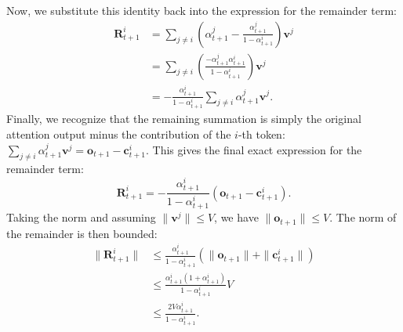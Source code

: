 Now, we substitute this identity back into the expression for the remainder term:
\begin{equation}
\begin{split}
    \mathbf{R}_{t+1}^i &= \sum_{j \neq i} \left( \alpha_{t+1}^j - \frac{\alpha_{t+1}^j}{1 - \alpha_{t+1}^i} \right) \mathbf{v}^j \\
    &= \sum_{j \neq i} \left( \frac{-\alpha_{t+1}^j \alpha_{t+1}^i}{1 - \alpha_{t+1}^i} \right) \mathbf{v}^j \\
    &= -\frac{\alpha_{t+1}^i}{1 - \alpha_{t+1}^i} \sum_{j \neq i} \alpha_{t+1}^j \mathbf{v}^j.
\end{split}
\end{equation}
Finally, we recognize that the remaining summation is simply the original attention output minus the contribution of the \(i\)-th token: \( \sum_{j \neq i} \alpha_{t+1}^j \mathbf{v}^j = \mathbf{o}_{t+1} - \mathbf{c}_{t+1}^i \). This gives the final exact expression for the remainder term:
\begin{equation}
    \mathbf{R}_{t+1}^i = -\frac{\alpha_{t+1}^i}{1-\alpha_{t+1}^i} \left( \mathbf{o}_{t+1} - \mathbf{c}_{t+1}^i \right).
\end{equation}
Taking the norm and assuming \( \|\mathbf{v}^j\| \le V \), we have \( \|\mathbf{o}_{t+1}\| \le V \). The norm of the remainder is then bounded:
\begin{equation}
\begin{split}
    \|\mathbf{R}_{t+1}^i\| &\le \frac{\alpha_{t+1}^i}{1-\alpha_{t+1}^i} \left( \|\mathbf{o}_{t+1}\| + \|\mathbf{c}_{t+1}^i\| \right) \\
    &\le \frac{\alpha_{t+1}^i(1+\alpha_{t+1}^i)}{1-\alpha_{t+1}^i} V \\
    &\le \frac{2V\alpha_{t+1}^i}{1-\alpha_{t+1}^i}.
\end{split}
\end{equation}




